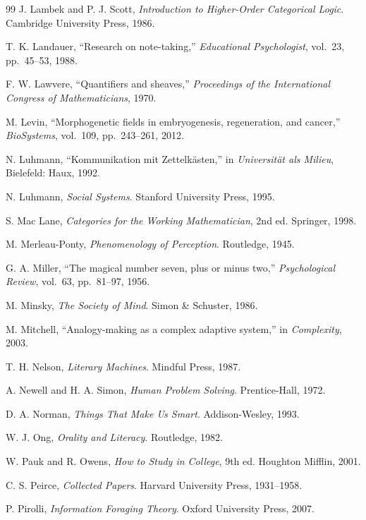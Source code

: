 \documentclass[12pt,oneside]{book}
\theoremstyle{plain}
\theoremstyle{definition}
\theoremstyle{plain}
\begin{document}
\begin{thebibliography}{99}
J. Lambek and P. J. Scott,
\textit{Introduction to Higher-Order Categorical Logic}.
Cambridge University Press, 1986.

T. K. Landauer,
``Research on note-taking,''
\textit{Educational Psychologist}, vol.~23, pp.~45--53, 1988.

F. W. Lawvere,
``Quantifiers and sheaves,''
\textit{Proceedings of the International Congress of Mathematicians}, 1970.

M. Levin,
``Morphogenetic fields in embryogenesis, regeneration, and cancer,''
\textit{BioSystems}, vol.~109, pp.~243--261, 2012.

N. Luhmann,
``Kommunikation mit Zettelk{\"a}sten,''
in \textit{Universit{\"a}t als Milieu}, Bielefeld: Haux, 1992.

N. Luhmann,
\textit{Social Systems}.
Stanford University Press, 1995.

S. Mac Lane,
\textit{Categories for the Working Mathematician}, 2nd ed.
Springer, 1998.

M. Merleau-Ponty,
\textit{Phenomenology of Perception}.
Routledge, 1945.

G. A. Miller,
``The magical number seven, plus or minus two,''
\textit{Psychological Review}, vol.~63, pp.~81--97, 1956.

M. Minsky,
\textit{The Society of Mind}.
Simon \& Schuster, 1986.

M. Mitchell,
``Analogy-making as a complex adaptive system,''
in \textit{Complexity}, 2003.

T. H. Nelson,
\textit{Literary Machines}.
Mindful Press, 1987.

A. Newell and H. A. Simon,
\textit{Human Problem Solving}.
Prentice-Hall, 1972.

D. A. Norman,
\textit{Things That Make Us Smart}.
Addison-Wesley, 1993.

W. J. Ong,
\textit{Orality and Literacy}.
Routledge, 1982.

W. Pauk and R. Owens,
\textit{How to Study in College}, 9th ed.
Houghton Mifflin, 2001.

C. S. Peirce,
\textit{Collected Papers}.
Harvard University Press, 1931--1958.

P. Pirolli,
\textit{Information Foraging Theory}.
Oxford University Press, 2007.


\end{thebibliography}
\end{document}
